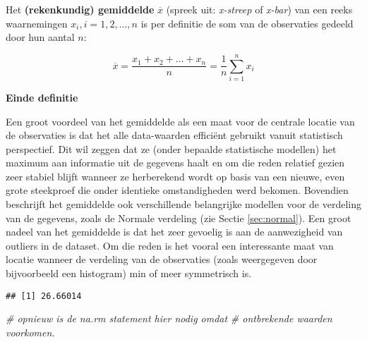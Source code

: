 \documentclass[12pt,dutch,coursenotes]{book}
\newenvironment{Shaded}{\begin{snugshade}}{\end{snugshade}}
\newcommand{\KeywordTok}[1]{\textcolor[rgb]{0.13,0.29,0.53}{\textbf{#1}}}
\newcommand{\DataTypeTok}[1]{\textcolor[rgb]{0.13,0.29,0.53}{#1}}
\newcommand{\CommentTok}[1]{\textcolor[rgb]{0.56,0.35,0.01}{\textit{#1}}}
\newcommand{\OtherTok}[1]{\textcolor[rgb]{0.56,0.35,0.01}{#1}}
\newcommand{\OperatorTok}[1]{\textcolor[rgb]{0.81,0.36,0.00}{\textbf{#1}}}
\newcommand{\NormalTok}[1]{#1}
\theoremstyle{definition}
\theoremstyle{definition}
\theoremstyle{definition}
\theoremstyle{remark}
\let\BeginKnitrBlock\begin \let\EndKnitrBlock\end
\begin{document}
\BeginKnitrBlock{definition}[rekenkundig gemiddelde]
\protect\hypertarget{def:unnamed-chunk-37}{}{\label{def:unnamed-chunk-37}
\iffalse (rekenkundig gemiddelde) \fi{} }Het \textbf{(rekenkundig)
gemiddelde} \(\overline{x}\) (spreek uit: \emph{x-streep} of
\emph{x-bar}) van een reeks waarnemingen \(x_i, i=1, 2, \dots, n\) is
per definitie de som van de observaties gedeeld door hun aantal \(n\):

\begin{equation*}
\overline{x}= \frac{x_1 + x_2 + \dots + x_n}{n} =\frac{1}{n} \sum_{i=1}^n x_i
\end{equation*}

\textbf{Einde definitie}
\EndKnitrBlock{definition}

Een groot voordeel van het gemiddelde als een maat voor de centrale
locatie van de observaties is dat het alle data-waarden efficiënt
gebruikt vanuit statistisch perspectief. Dit wil zeggen dat ze (onder
bepaalde statistische modellen) het maximum aan informatie uit de
gegevens haalt en om die reden relatief gezien zeer stabiel blijft
wanneer ze herberekend wordt op basis van een nieuwe, even grote
steekproef die onder identieke omstandigheden werd bekomen. Bovendien
beschrijft het gemiddelde ook verschillende belangrijke modellen voor de
verdeling van de gegevens, zoals de Normale verdeling (zie Sectie
\ref{sec:normal}). Een groot nadeel van het gemiddelde is dat het zeer
gevoelig is aan de aanwezigheid van outliers in de dataset. Om die reden
is het vooral een interessante maat van locatie wanneer de verdeling van
de observaties (zoals weergegeven door bijvoorbeeld een histogram) min
of meer symmetrisch is.

\begin{Shaded}
\end{Shaded}

\begin{verbatim}
## [1] 26.66014
\end{verbatim}

\begin{Shaded}
\begin{Highlighting}[]
\CommentTok{# opnieuw is de na.rm statement hier nodig omdat}
\CommentTok{# ontbrekende waarden voorkomen.}
\end{Highlighting}
\end{Shaded}
\end{document}
